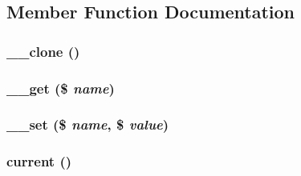 \subsection{Member Function Documentation}
\hypertarget{class_cahnory_d_b___record_d0cb87b388bc74d63dc884accdca8713}{
\subsubsection[{\_\-\_\-clone}]{\setlength{\rightskip}{0pt plus 5cm}\_\-\_\-clone ()}}
\label{class_cahnory_d_b___record_d0cb87b388bc74d63dc884accdca8713}


\hypertarget{class_cahnory_d_b___record_bc8e9e31bb15c8a44c3210ec551407c8}{
\subsubsection[{\_\-\_\-get}]{\setlength{\rightskip}{0pt plus 5cm}\_\-\_\-get (\$ {\em name})}}
\label{class_cahnory_d_b___record_bc8e9e31bb15c8a44c3210ec551407c8}


\hypertarget{class_cahnory_d_b___record_83c2703c91959192f759992ad5640b67}{
\subsubsection[{\_\-\_\-set}]{\setlength{\rightskip}{0pt plus 5cm}\_\-\_\-set (\$ {\em name}, \/  \$ {\em value})}}
\label{class_cahnory_d_b___record_83c2703c91959192f759992ad5640b67}


\hypertarget{class_cahnory_d_b___record_f343507d1926e6ecf964625d41db528c}{
\subsubsection[{current}]{\setlength{\rightskip}{0pt plus 5cm}current ()}}
\label{class_cahnory_d_b___record_f343507d1926e6ecf964625d41db528c}


